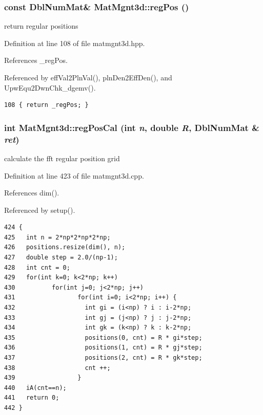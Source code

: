 \subsubsection{\setlength{\rightskip}{0pt plus 5cm}const Dbl\-Num\-Mat\& Mat\-Mgnt3d::reg\-Pos ()\hspace{0.3cm}{\tt  [inline]}}\label{classMatMgnt3d_3e4e5fb8bf4f06cf8295d32216124585_3e4e5fb8bf4f06cf8295d32216124585}


return regular positions 

Definition at line 108 of file matmgnt3d.hpp.

References \_\-reg\-Pos.

Referenced by eff\-Val2Pln\-Val(), pln\-Den2Eff\-Den(), and Upw\-Equ2Dwn\-Chk\_\-dgemv().

\footnotesize\begin{verbatim}108 { return _regPos; }
\end{verbatim}\normalsize 


\subsubsection{\setlength{\rightskip}{0pt plus 5cm}int Mat\-Mgnt3d::reg\-Pos\-Cal (int {\em n}, double {\em R}, Dbl\-Num\-Mat \& {\em ret})}\label{classMatMgnt3d_4169f2bfee02545e9e3579c703129d1f_4169f2bfee02545e9e3579c703129d1f}


calculate the fft regular position grid 

Definition at line 423 of file matmgnt3d.cpp.

References dim().

Referenced by setup().

\footnotesize\begin{verbatim}424 {
425   int n = 2*np*2*np*2*np;
426   positions.resize(dim(), n);
427   double step = 2.0/(np-1);
428   int cnt = 0;
429   for(int k=0; k<2*np; k++)
430          for(int j=0; j<2*np; j++)
431                 for(int i=0; i<2*np; i++) {
432                   int gi = (i<np) ? i : i-2*np;
433                   int gj = (j<np) ? j : j-2*np;
434                   int gk = (k<np) ? k : k-2*np;
435                   positions(0, cnt) = R * gi*step;
436                   positions(1, cnt) = R * gj*step;
437                   positions(2, cnt) = R * gk*step;
438                   cnt ++;
439                 }
440   iA(cnt==n);
441   return 0;
442 }
\end{verbatim}\normalsize 


